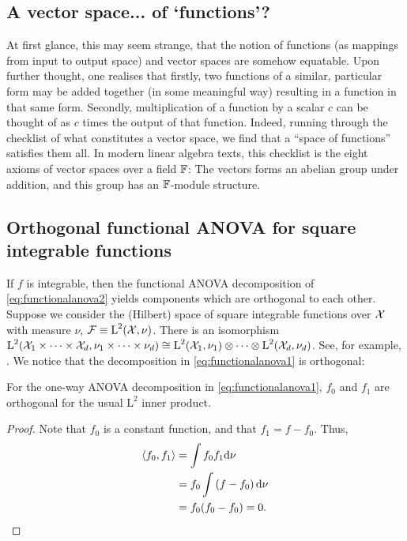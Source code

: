 \subsection{A vector space... of `functions'?}

At first glance, this may seem strange, that the notion of functions (as mappings from input to output space) and vector spaces are somehow equatable.
Upon further thought, one realises that firstly, two functions of a similar, particular form may be added together (in some meaningful way) resulting in a function in that same form. 
Secondly, multiplication of a function by a scalar $c$ can be thought of as $c$ times the output of that function.
Indeed, running through the checklist of what constitutes a vector space, we find that a ``space of functions'' satisfies them all.
In modern linear algebra texts, this checklist is the eight axioms of vector spaces over a field $\mathbb{F}$: The vectors forms an abelian group under addition, and this group has an $\mathbb{F}$-module structure.

\subsection{Orthogonal functional ANOVA for square integrable functions}

If $f$ is integrable, then the functional ANOVA decomposition of \cref{eq:functionalanova2} yields components which are orthogonal to each other.
Suppose we consider the (Hilbert) space of square integrable functions over ${\mathcal X}$ with measure $\nu$, ${\mathcal F} \equiv \text{L}^2({\mathcal X},\nu)$.
There is an isomorphism $\text{L}^2({\mathcal X}_1\times\cdots\times{\mathcal X}_d,\nu_1\times\cdots\times\nu_d) \cong \text{L}^2({\mathcal X}_1,\nu_1) \otimes \cdots \otimes \text{L}^2({\mathcal X}_d,\nu_d)$. 
See, for example, \citet{reed1972methods,kree1974produits}.
We notice that the decomposition in \cref{eq:functionalanova1} is orthogonal:

\begin{claim}
  For the one-way ANOVA decomposition in \cref{eq:functionalanova1}, $f_0$ and $f_1$ are orthogonal for the usual $\text{L}^2$ inner product.
\end{claim}

\begin{proof}
  Note that $f_0$ is a constant function, and that $f_1 = f- f_0$.
  Thus,
  \begin{align*}
    \langle f_0,f_1\rangle 
    &= \int f_0f_1 \text{d}\nu \\
    &= f_0 \int \left(f - f_0\right) \text{d}\nu \\
    &= f_0 (f_0 - f_0) = 0. \qedhere
  \end{align*}
\end{proof}

